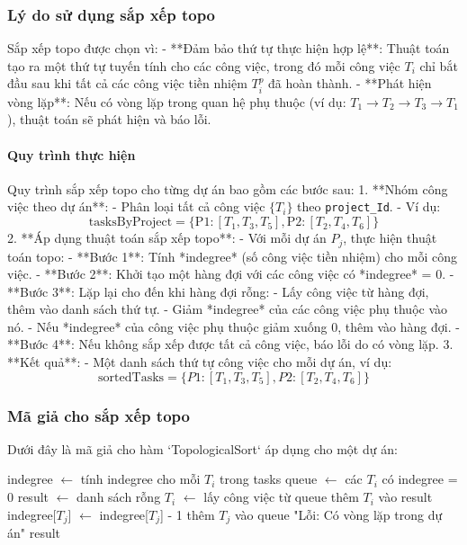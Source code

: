 \documentclass[a4paper,12pt]{article}
\begin{document}
\subsubsection{Lý do sử dụng sắp xếp topo}

Sắp xếp topo được chọn vì:
- **Đảm bảo thứ tự thực hiện hợp lệ**: Thuật toán tạo ra một thứ tự tuyến tính cho các công việc, trong đó mỗi công việc $T_i$ chỉ bắt đầu sau khi tất cả các công việc tiền nhiệm $T_i^p$ đã hoàn thành.
- **Phát hiện vòng lặp**: Nếu có vòng lặp trong quan hệ phụ thuộc (ví dụ: \( T_1 \to T_2 \to T_3 \to T_1 \)), thuật toán sẽ phát hiện và báo lỗi.

\paragraph{Quy trình thực hiện}

Quy trình sắp xếp topo cho từng dự án bao gồm các bước sau:
1. **Nhóm công việc theo dự án**:
    - Phân loại tất cả công việc \( \{T_i\} \) theo \texttt{project\_Id}.
    - Ví dụ:
      \[
      \text{tasksByProject} = \{ \text{P1}: [T_1, T_3, T_5], \text{P2}: [T_2, T_4, T_6] \}
      \]
2. **Áp dụng thuật toán sắp xếp topo**:
    - Với mỗi dự án \( P_j \), thực hiện thuật toán topo:
      - **Bước 1**: Tính *indegree* (số công việc tiền nhiệm) cho mỗi công việc.
      - **Bước 2**: Khởi tạo một hàng đợi với các công việc có *indegree* = 0.
      - **Bước 3**: Lặp lại cho đến khi hàng đợi rỗng:
         - Lấy công việc từ hàng đợi, thêm vào danh sách thứ tự.
         - Giảm *indegree* của các công việc phụ thuộc vào nó.
         - Nếu *indegree* của công việc phụ thuộc giảm xuống 0, thêm vào hàng đợi.
      - **Bước 4**: Nếu không sắp xếp được tất cả công việc, báo lỗi do có vòng lặp.
3. **Kết quả**:
    - Một danh sách thứ tự công việc cho mỗi dự án, ví dụ:
      \[
      \text{sortedTasks} = \{ P1: [T_1, T_3, T_5], P2: [T_2, T_4, T_6] \}
      \]

\subsubsection*{Mã giả cho sắp xếp topo}

Dưới đây là mã giả cho hàm `TopologicalSort` áp dụng cho một dự án:

\begin{algorithm}
\begin{algorithmic}[1]
     \State indegree $\gets$ tính indegree cho mỗi $T_i$ trong tasks
     \State queue $\gets$ các $T_i$ có indegree = 0
     \State result $\gets$ danh sách rỗng
          \State $T_i$ $\gets$ lấy công việc từ queue
          \State thêm $T_i$ vào result
                \State indegree[$T_j$] $\gets$ indegree[$T_j$] - 1
                     \State thêm $T_j$ vào queue
                \EndIf
          \EndFor
     \EndWhile
          \State \Return "Lỗi: Có vòng lặp trong dự án"
     \EndIf
     \State \Return result
\EndFunction
\end{algorithmic}
\end{algorithm}
\end{document}
